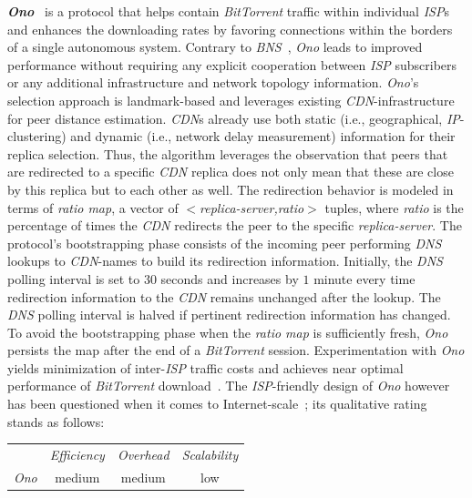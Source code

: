 \textbf{\emph{Ono}}~\cite{CB2008} is a protocol that helps contain
\emph{BitTorrent} traffic within individual \emph{ISP}s
and enhances the downloading rates by favoring connections
within the borders of a single autonomous system. Contrary to
\emph{BNS}~\cite{BCCMSBZ2006},
\emph{Ono} leads to improved performance 
without requiring any explicit cooperation between 
\emph{ISP} subscribers or any additional
infrastructure and network topology information.
\emph{Ono}'s selection approach is 
landmark-based and leverages existing \emph{CDN}-infrastructure 
for peer distance estimation. \emph{CDN}s already use both static (i.e.,
geographical, \emph{IP}-clustering) and dynamic (i.e., network delay measurement)
information for their replica selection. Thus, the algorithm leverages the
observation that peers that are redirected to a specific \emph{CDN} replica does not
only mean that these are close by this replica but to each other as well.
The redirection behavior is modeled in terms of \emph{ratio map}, 
a vector of \emph{$<$replica-server,ratio$>$} tuples, where \emph{ratio} is
the percentage of times the \emph{CDN} redirects the peer 
to the specific \emph{replica-server}.
The protocol's bootstrapping phase consists of the incoming peer performing
\emph{DNS} lookups to \emph{CDN}-names to build its redirection information.
Initially, the \emph{DNS} polling interval is set to $30$ seconds 
and increases by $1$ minute every time redirection information 
to the \emph{CDN} remains unchanged after the lookup.
The \emph{DNS} polling interval is halved if pertinent 
redirection information has changed.
To avoid the bootstrapping phase when the \emph{ratio map} 
is sufficiently fresh, 
\emph{Ono} persists the map after the end of a \emph{BitTorrent} session.
Experimentation with \emph{Ono} yields minimization of
inter-\emph{ISP} traffic costs and achieves near optimal performance 
of \emph{BitTorrent} download~\cite{BCCMSBZ2006}.
The \emph{ISP}-friendly design of \emph{Ono} however has been questioned when 
it comes to Internet-scale~\cite{PMJKA2009,LCLX2009,CLYSR2011};
its qualitative rating stands as follows:
\begin{center}
{\footnotesize
\begin{tabular}{rccc}
\multicolumn{1}{r}{} &
\multicolumn{1}{c}{\emph{Efficiency}} &
\multicolumn{1}{c}{\emph{Overhead}} &
\multicolumn{1}{c}{\emph{Scalability}}
\\
\cline{2-4}
\emph{Ono} &
medium &
medium &
low
\end{tabular}
}
\end{center}

